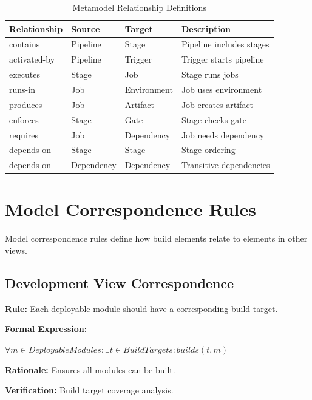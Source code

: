 \documentclass[11pt,letterpaper]{article}
\begin{document}
\begin{table}[H]
\centering
\caption{Metamodel Relationship Definitions}
\small
\begin{tabular}{@{}L{2.3cm}L{2.3cm}L{2.3cm}L{\dimexpr\linewidth-6.9cm-6\tabcolsep\relax}@{}}
\toprule
\textbf{Relationship} & \textbf{Source} & \textbf{Target} & \textbf{Description} \\
\midrule
contains & Pipeline & Stage & Pipeline includes stages \\
\addlinespace
activated-by & Pipeline & Trigger & Trigger starts pipeline \\
\addlinespace
executes & Stage & Job & Stage runs jobs \\
\addlinespace
runs-in & Job & Environment & Job uses environment \\
\addlinespace
produces & Job & Artifact & Job creates artifact \\
\addlinespace
enforces & Stage & Gate & Stage checks gate \\
\addlinespace
requires & Job & Dependency & Job needs dependency \\
\addlinespace
depends-on & Stage & Stage & Stage ordering \\
\addlinespace
depends-on & Dependency & Dependency & Transitive dependencies \\
\bottomrule
\end{tabular}
\end{table}

\section{Model Correspondence Rules}

Model correspondence rules define how build elements relate to elements in other views.

\subsection{Development View Correspondence}

\begin{definitionbox}
\textbf{Rule:} Each deployable module should have a corresponding build target.

\textbf{Formal Expression:}
\begin{center}
$\forall m \in DeployableModules : \exists t \in BuildTargets : builds(t, m)$
\end{center}

\textbf{Rationale:} Ensures all modules can be built.

\textbf{Verification:} Build target coverage analysis.
\end{definitionbox}
\end{document}
